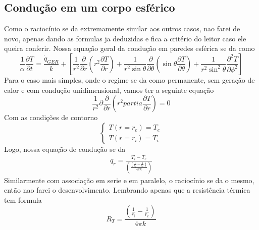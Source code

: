 \subsection{Condução em um corpo esférico}
Como o raciocínio se da extremamente similar aos outros casos, nao farei de novo, apenas dando as
formulas ja deduzidas e fica a critério do leitor caso ele queira conferir. Nossa equação geral da
condução em paredes esférica se da como
\begin{equation}\label{eq: equacao geral da conducao em paredes esfericas}
    \frac{1}{\alpha } \frac{\partial T}{\partial t} = \frac{\dot{q}_{GER} }{k} + \left[ \frac{1}{r^{2} } \frac{\partial}{\partial r} \left( r^2 \frac{\partial T}{\partial r} \right) + \frac{1}{r^{2} \sin \theta } \frac{\partial}{\partial \theta} \left( \sin \theta \frac{\partial T}{\partial \theta} \right) + \frac{1}{r^{2} \sin ^{2} \theta } \frac{\partial ^{2} T}{\partial \phi ^{2}} \right]
\end{equation}
Para o caso mais simples, onde o regime se da como permanente, sem geração de calor e com condução
unidimensional, vamos ter a seguinte equação
\begin{equation}
    \frac{1}{r^2} \partial\frac{\partial }{\partial r} \left(r^2 partia\frac{\partial T}{\partial r} \right) = 0 
\end{equation}
Com as condições de contorno
\begin{equation}
    \begin{cases}
        T(r = r_e) = T_{e} \\
        T(r= r_i) = T_{i}
    \end{cases}
\end{equation}
Logo, nossa equação de condução se da
\begin{align}
    q_r = \frac{T_i - T_e}{\left(\frac{\left(\frac{1}{r_i} - \frac{1}{r_e}  \right)}{4 \pi k}\right)} 
\end{align}
Similarmente com associação em serie e em paralelo, o raciocínio se da o mesmo, então nao farei o
desenvolvimento. Lembrando apenas que a resistência térmica tem formula
\begin{equation}
    R_T = \frac{\left(\frac{1}{r_i} - \frac{1}{r_e}\right)}{4\pi k} 
\end{equation}
